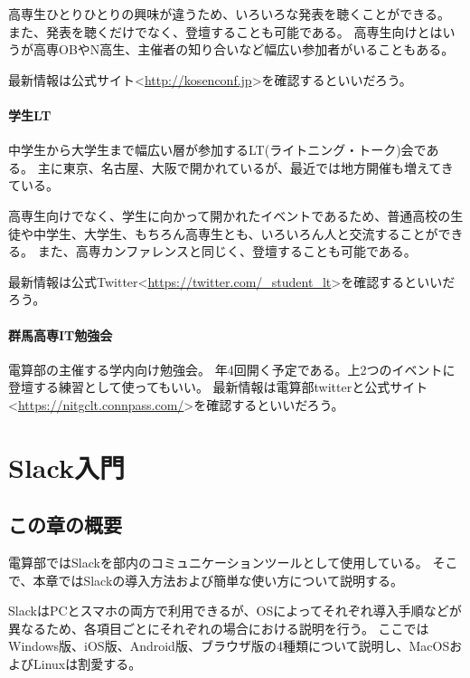 \documentclass[lualatex,ja=standard,12pt,a4j]{bxjsbook}
\begin{document}
					高専生ひとりひとりの興味が違うため、いろいろな発表を聴くことができる。
					また、発表を聴くだけでなく、登壇することも可能である。
					高専生向けとはいうが高専OBやN高生、主催者の知り合いなど幅広い参加者がいることもある。
					
					最新情報は公式サイト<\url{http://kosenconf.jp}>を確認するといいだろう。
				\subsubsection{学生LT}
					中学生から大学生まで幅広い層が参加するLT(ライトニング・トーク)会である。
					主に東京、名古屋、大阪で開かれているが、最近では地方開催も増えてきている。
					
					高専生向けでなく、学生に向かって開かれたイベントであるため、普通高校の生徒や中学生、大学生、もちろん高専生とも、いろいろん人と交流することができる。
					また、高専カンファレンスと同じく、登壇することも可能である。
					
					最新情報は公式Twitter<\url{https://twitter.com/_student_lt}>を確認するといいだろう。
				\subsubsection{群馬高専IT勉強会}
					電算部の主催する学内向け勉強会。
					年4回開く予定である。上2つのイベントに登壇する練習として使ってもいい。
					最新情報は電算部twitterと公式サイト<\url{https://nitgclt.connpass.com/}>を確認するといいだろう。
	\chapter{Slack入門}
		\section{この章の概要}
			電算部ではSlackを部内のコミュニケーションツールとして使用している。
            そこで、本章ではSlackの導入方法および簡単な使い方について説明する。
            
            SlackはPCとスマホの両方で利用できるが、OSによってそれぞれ導入手順などが異なるため、各項目ごとにそれぞれの場合における説明を行う。
            ここではWindows版、iOS版、Android版、ブラウザ版の4種類について説明し、MacOSおよびLinuxは割愛する。
            
\end{document}

